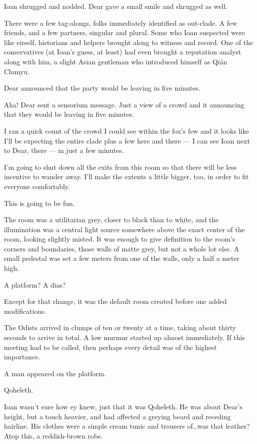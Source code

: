 Ioan shrugged and nodded. Dear gave a small smile and shrugged as well.

There were a few tag-alongs, folks immediately identified as out-clade. A few friends, and a few partners, singular and plural. Some who Ioan suspected were like eirself, historians and helpers brought along to witness and record. One of the conservatives (at Ioan's guess, at least) had even brought a reputation analyst along with him, a slight Asian gentleman who introduced himself as Qián Chunyu.

Dear announced that the party would be leaving in five minutes.

\secdiv{}

\noindent Aha! Dear sent a sensorium message. Just a view of a crowd and it announcing that they would be leaving in five minutes.

I ran a quick count of the crowd I could see within the fox's few and it looks like I'll be expecting the entire clade plus a few here and there --- I can see Ioan next to Dear, there --- in just a few minutes.

I'm going to shut down all the exits from this room so that there will be less incentive to wander away. I'll make the extents a little bigger, too, in order to fit everyone comfortably.

This is going to be fun.

\secdiv{}

\noindent The room was a utilitarian grey, closer to black than to white, and the illumination was a central light source somewhere above the exact center of the room, looking slightly misted. It was enough to give definition to the room's corners and boundaries, those walls of matte grey, but not a whole lot else. A small pedestal was set a few meters from one of the walls, only a half a meter high.

A platform? A dias?

Except for that change, it was the default room created before one added modifications.

The Odists arrived in clumps of ten or twenty at a time, taking about thirty seconds to arrive in total. A low murmur started up almost immediately. If this meeting had to be called, then perhaps every detail was of the highest importance.

A man appeared on the platform.

Qoheleth.

Ioan wasn't sure how ey knew, just that it was Qoheleth. He was about Dear's height, but a touch heavier, and had affected a greying beard and receding hairline. His clothes were a simple cream tunic and trousers of\ldots{}was that leather? Atop this, a reddish-brown robe.

